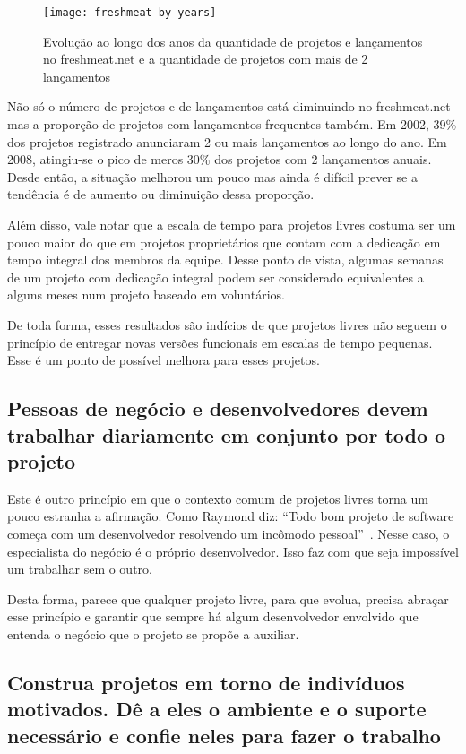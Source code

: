 \begin{figure}
  \centering
  \texttt{[image: freshmeat-by-years]}
  \caption{Evolução ao longo dos anos da quantidade de projetos e
    lançamentos no freshmeat.net e a quantidade de projetos com mais
    de 2 lançamentos}
  \label{fig:freshmeat-by-years}
\end{figure}

Não só o número de projetos e de lançamentos está diminuindo no
freshmeat.net mas a proporção de projetos com lançamentos frequentes
também. Em 2002, 39\% dos projetos registrado anunciaram 2 ou mais
lançamentos ao longo do ano. Em 2008, atingiu-se o pico de meros 30\%
dos projetos com 2 lançamentos anuais. Desde então, a situação
melhorou um pouco mas ainda é difícil prever se a tendência é de
aumento ou diminuição dessa proporção.

Além disso, vale notar que a escala de tempo para projetos livres
costuma ser um pouco maior do que em projetos proprietários que contam
com a dedicação em tempo integral dos membros da equipe. Desse ponto
de vista, algumas semanas de um projeto com dedicação integral podem
ser considerado equivalentes a alguns meses num projeto baseado em
voluntários.

De toda forma, esses resultados são indícios de que projetos livres
não seguem o princípio de entregar novas versões funcionais em escalas
de tempo pequenas. Esse é um ponto de possível melhora para esses
projetos.

\subsection[Trabalhar com pessoas de negócio]{Pessoas de negócio e
  desenvolvedores devem trabalhar diariamente em conjunto por todo o
  projeto}

Este é outro princípio em que o contexto comum de projetos livres
torna um pouco estranha a afirmação. Como Raymond diz: ``Todo bom
projeto de software começa com um desenvolvedor resolvendo um incômodo
pessoal''~\cite{Raymond1999}. Nesse caso, o especialista do negócio é
o próprio desenvolvedor. Isso faz com que seja impossível um trabalhar
sem o outro.

Desta forma, parece que qualquer projeto livre, para que evolua,
precisa abraçar esse princípio e garantir que sempre há algum
desenvolvedor envolvido que entenda o negócio que o projeto se propõe
a auxiliar.

\subsection[Trabalhar com indivíduos motivados]{ Construa projetos em
  torno de indivíduos motivados.  Dê a eles o ambiente e o suporte
  necessário e confie neles para fazer o trabalho}

